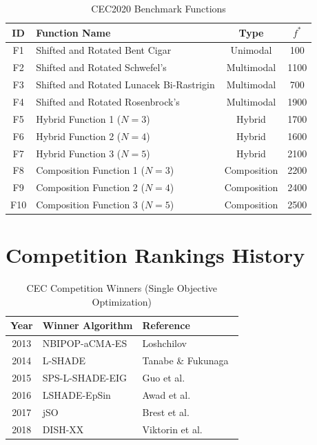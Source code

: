 \documentclass[11pt]{article}
\begin{document}
\begin{table}[htbp]
\centering
\caption{CEC2020 Benchmark Functions}
\label{tab:cec2020functions}
\begin{tabular}{@{}clcc@{}}
\toprule
\textbf{ID} & \textbf{Function Name} & \textbf{Type} & $f^*$ \\
\midrule
F1 & Shifted and Rotated Bent Cigar & Unimodal & 100 \\
F2 & Shifted and Rotated Schwefel's & Multimodal & 1100 \\
F3 & Shifted and Rotated Lunacek Bi-Rastrigin & Multimodal & 700 \\
F4 & Shifted and Rotated Rosenbrock's & Multimodal & 1900 \\
F5 & Hybrid Function 1 ($N=3$) & Hybrid & 1700 \\
F6 & Hybrid Function 2 ($N=4$) & Hybrid & 1600 \\
F7 & Hybrid Function 3 ($N=5$) & Hybrid & 2100 \\
F8 & Composition Function 1 ($N=3$) & Composition & 2200 \\
F9 & Composition Function 2 ($N=4$) & Composition & 2400 \\
F10 & Composition Function 3 ($N=5$) & Composition & 2500 \\
\bottomrule
\end{tabular}
\end{table}

\section{Competition Rankings History}

\begin{table}[htbp]
\centering
\caption{CEC Competition Winners (Single Objective Optimization)}
\label{tab:winners}
\begin{tabular}{@{}cll@{}}
\toprule
\textbf{Year} & \textbf{Winner Algorithm} & \textbf{Reference} \\
\midrule
2013 & NBIPOP-aCMA-ES & Loshchilov~\cite{loshchilov2013cmaes} \\
2014 & L-SHADE & Tanabe \& Fukunaga~\cite{tanabe2014lshade} \\
2015 & SPS-L-SHADE-EIG & Guo et al.~\cite{guo2015spslshade} \\
2016 & LSHADE-EpSin & Awad et al.~\cite{awad2016lshadeepsin} \\
2017 & jSO & Brest et al.~\cite{brest2017jso} \\
2018 & DISH-XX & Viktorin et al.~\cite{viktorin2018dish} \\
\bottomrule
\end{tabular}
\end{table}
\end{document}
